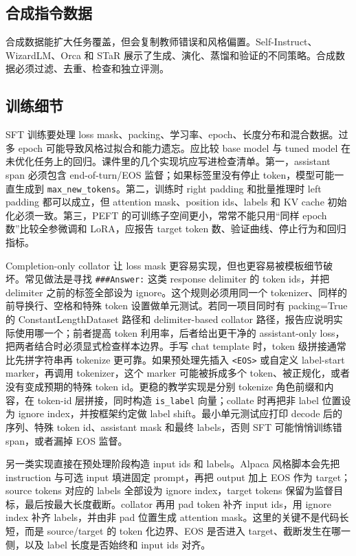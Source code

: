 \documentclass[UTF8,zihao=-4,openany]{ctexbook}
\begin{document}
\subsection{合成指令数据}
合成数据能扩大任务覆盖，但会复制教师错误和风格偏置。Self-Instruct、WizardLM、Orca 和 STaR 展示了生成、演化、蒸馏和验证的不同策略。合成数据必须过滤、去重、检查和独立评测。

\subsection{训练细节}
SFT 训练要处理 loss mask、packing、学习率、epoch、长度分布和混合数据。过多 epoch 可能导致风格过拟合和能力遗忘。应比较 base model 与 tuned model 在未优化任务上的回归。课件里的几个实现坑应写进检查清单。第一，assistant span 必须包含 end-of-turn/EOS 监督；如果标签里没有停止 token，模型可能一直生成到 \texttt{max\_new\_tokens}。第二，训练时 right padding 和批量推理时 left padding 都可以成立，但 attention mask、position ids、labels 和 KV cache 初始化必须一致。第三，PEFT 的可训练子空间更小，常常不能只用“同样 epoch 数”比较全参微调和 LoRA，应报告 target token 数、验证曲线、停止行为和回归指标。

Completion-only collator 让 loss mask 更容易实现，但也更容易被模板细节破坏。常见做法是寻找 \texttt{\#\#\#Answer:} 这类 response delimiter 的 token ids，并把 delimiter 之前的标签全部设为 ignore。这个规则必须用同一个 tokenizer、同样的前导换行、空格和特殊 token 设置做单元测试。若同一项目同时有 packing=True 的 ConstantLengthDataset 路径和 delimiter-based collator 路径，报告应说明实际使用哪一个；前者提高 token 利用率，后者给出更干净的 assistant-only loss，把两者结合时必须显式检查样本边界。手写 chat template 时，token 级拼接通常比先拼字符串再 tokenize 更可靠。如果预处理先插入 \texttt{<EOS>} 或自定义 label-start marker，再调用 tokenizer，这个 marker 可能被拆成多个 token、被正规化，或者没有变成预期的特殊 token id。更稳的教学实现是分别 tokenize 角色前缀和内容，在 token-id 层拼接，同时构造 \texttt{is\_label} 向量；collate 时再把非 label 位置设为 ignore index，并按框架约定做 label shift。最小单元测试应打印 decode 后的序列、特殊 token id、assistant mask 和最终 labels，否则 SFT 可能悄悄训练错 span，或者漏掉 EOS 监督。

另一类实现直接在预处理阶段构造 input ids 和 labels。Alpaca 风格脚本会先把 instruction 与可选 input 填进固定 prompt，再把 output 加上 EOS 作为 target；source tokens 对应的 labels 全部设为 ignore index，target tokens 保留为监督目标，最后按最大长度截断。collator 再用 pad token 补齐 input ids，用 ignore index 补齐 labels，并由非 pad 位置生成 attention mask。这里的关键不是代码长短，而是 source/target 的 token 化边界、EOS 是否进入 target、截断发生在哪一侧，以及 label 长度是否始终和 input ids 对齐。
\end{document}
